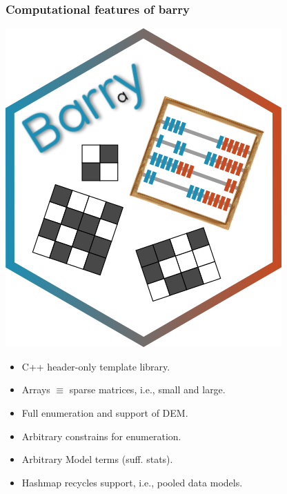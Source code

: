 \documentclass[aspectratio=169,9pt,handout]{beamer}
\begin{document}
\begin{frame}[label=aphylo-current]
\end{frame}

\begin{frame}
	\frametitle{Computational features of \textbf{barry}}
	\begin{minipage}[m]{.55\linewidth}
		\vspace{-1cm}\raggedleft\includegraphics[width=.35\linewidth]{barry-logo.png}\\\vspace{-.5cm}
		\raggedright
		\small
		\begin{itemize}
			\item<2-> C++ header-only template library.
			\item<3-> Arrays $\equiv$ sparse matrices, i.e., small and large.
			\item<4-> Full enumeration and support of DEM.
			\item<5-> Arbitrary constrains for enumeration.
		\end{itemize}
		\begin{itemize}
			\item<7-> Arbitrary Model terms (suff. stats).
			\item<8-> Hashmap recycles support, i.e., pooled data models.
		\end{itemize}
	\end{minipage}\hfill
	\begin{minipage}[m]{.44\linewidth}
		\centering

\end{minipage}
\end{frame}
\end{document}
